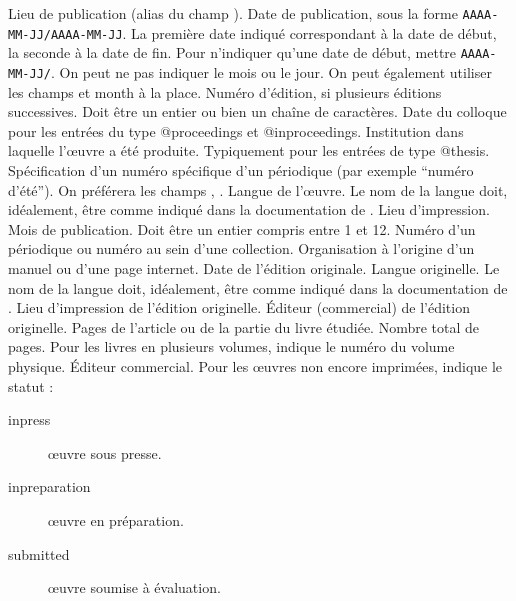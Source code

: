 \begin{fieldlist}
	 Lieu de publication (alias du champ ).	
   	 Date de publication, sous la forme \verb|AAAA-MM-JJ/AAAA-MM-JJ|. La première date indiqué correspondant à la date de début, la seconde à la date de fin. Pour n'indiquer qu'une date de début, mettre \verb|AAAA-MM-JJ/|. On peut ne pas indiquer le mois ou le jour. On peut également utiliser les champs  et {month} à la place. 
   	 Numéro d'édition, si plusieurs éditions successives. Doit être un entier ou bien un chaîne de caractères.				
   	 Date du colloque pour les entrées du type @proceedings et @inproceedings. 
   	 Institution dans laquelle l'œuvre a été produite. Typiquement pour les entrées de type @thesis. 
   	 Spécification d'un numéro spécifique d'un périodique (par exemple \enquote{numéro d'été}). On préférera les champs , .	
   	 Langue de l'œuvre. Le nom de la langue doit, idéalement, être comme indiqué dans la documentation de .					
   	 Lieu d'impression.  					
   	 Mois de publication. Doit être un entier compris entre 1 et 12. 
   	 Numéro d'un périodique ou numéro au sein d'une collection. 	
   	 Organisation à l'origine d'un manuel ou d'une page internet.	
   	 Date de l'édition originale.						
   	 Langue originelle. Le nom de la langue doit, idéalement, être comme indiqué dans la documentation de . 
   	 Lieu d'impression de l'édition	originelle.		
   	 Éditeur (commercial) de l'édition originelle.		
	 Pages de l'article ou de la partie du livre étudiée. 
	 Nombre total de pages.
   	 Pour les livres en plusieurs volumes, indique le numéro du volume physique. 
   	 Éditeur commercial.					
   	 Pour les œuvres non encore imprimées, indique le statut :
					\begin{description}
						\item[inpress]œuvre sous presse.
						\item[inpreparation]œuvre en préparation.
						\item[submitted]œuvre soumise à évaluation.
					\end{description}
					

\end{fieldlist}
